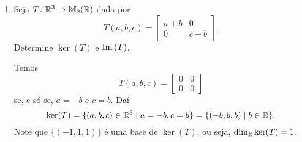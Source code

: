 \begin{exemplos}
    \begin{enumerate}[label={\arabic*})]
        \item Seja $T \colon \mathbb{R}^3 \to \mathbb{M}_2(\mathbb{R})$ dada por
        \[
            T(a,b,c) = \begin{bmatrix}
                a + b & 0\\
                0 & c - b
            \end{bmatrix}.
        \]
        Determine $\ker(T)$ e ${\rm Im\,}(T)$.
        \begin{solucao}
            Temos
            \[
                T(a,b,c) = \begin{bmatrix}
                0 & 0\\
                0 & 0
                \end{bmatrix}
            \]
            se, e s\'o se, $a = -b$ e $c = b$. Daí
            \[
                \ker(T) = \{(a,b,c) \in \mathbb{R}^3 \mid a = -b, c = b\} = \{(-b,b,b) \mid b \in \mathbb{R}\}.
            \]
            Note que $\{(-1,1,1)\}$ é uma base de $\ker(T)$, ou seja, $\dim_{\mathbb{R}} \ker(T) = 1$.


\end{solucao}
\end{enumerate}
\end{exemplos}
